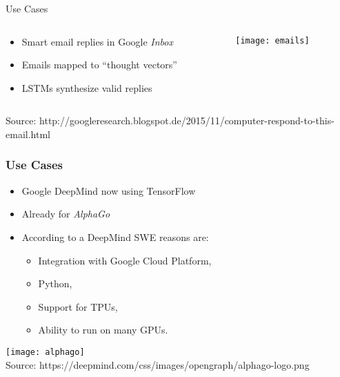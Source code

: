 \begin{slide}{Use Cases}
\begin{columns}
  \begin{column}{0.6\textwidth}
    \begin{itemize}
      \item Smart email replies in Google \emph{Inbox}
      \item Emails mapped to ``thought vectors''
      \item LSTMs synthesize valid replies
    \end{itemize}
  \end{column}
  \begin{column}{0.4\textwidth}
    \begin{figure}
      \texttt{[image: emails]}
    \end{figure}
  \end{column}
\end{columns}
{\tiny Source: http://googleresearch.blogspot.de/2015/11/computer-respond-to-this-email.html}
\end{slide}

\begin{frame}
  \frametitle{Use Cases}
  \begin{itemize}
  \item Google DeepMind now using TensorFlow
  \item Already for \emph{AlphaGo}
  \item According to a DeepMind SWE reasons are:

    \begin{itemize}
    \item Integration with Google Cloud Platform,
    \item Python,
    \item Support for TPUs,
    \item Ability to run on many GPUs.
    \end{itemize}
  \end{itemize}
  \begin{center}
    \texttt{[image: alphago]}\\
    \vspace{0.1cm}
    \tiny Source:
      https://deepmind.com/css/images/opengraph/alphago-logo.png
  \end{center}
\end{frame}

